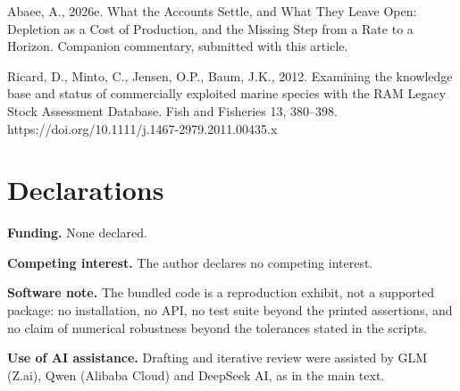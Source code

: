 \documentclass[11pt]{article}
\begin{document}
Abaee, A., 2026e. What the Accounts Settle, and What They Leave Open: Depletion as a Cost of Production, and the Missing Step from a Rate to a Horizon. Companion commentary, submitted with this article.

Ricard, D., Minto, C., Jensen, O.P., Baum, J.K., 2012. Examining the knowledge base and status of commercially exploited marine species with the RAM Legacy Stock Assessment Database. Fish and Fisheries 13, 380--398. https://doi.org/10.1111/j.1467-2979.2011.00435.x

\vspace{0.8em}

\section*{Declarations}\label{declarations}

\textbf{Funding.} None declared.

\textbf{Competing interest.} The author declares no competing interest.

\textbf{Software note.} The bundled code is a reproduction exhibit, not a supported package: no installation, no API, no test suite beyond the printed assertions, and no claim of numerical robustness beyond the tolerances stated in the scripts.

\textbf{Use of AI assistance.} Drafting and iterative review were assisted by GLM (Z.ai), Qwen (Alibaba Cloud) and DeepSeek AI, as in the main text.
\end{document}
